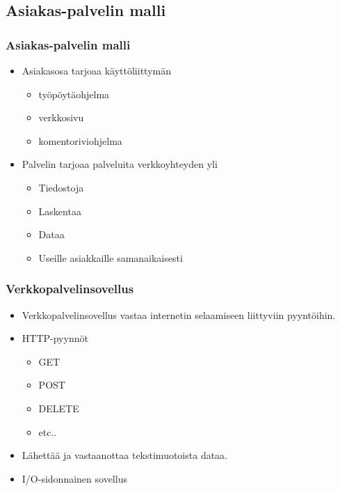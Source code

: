 \documentclass{beamer}
\begin{document}
\subsection{Asiakas-palvelin malli}
\begin{frame}
    \frametitle{Asiakas-palvelin malli}
    \begin{itemize}
        \item Asiakasosa tarjoaa käyttöliittymän
        \begin{itemize}
            \item työpöytäohjelma
            \item verkkosivu
            \item komentoriviohjelma
        \end{itemize}
        \item Palvelin tarjoaa palveluita verkkoyhteyden yli
            \begin{itemize}
                \item Tiedostoja
                \item Laskentaa
                \item Dataa
                \item Useille asiakkaille samanaikaisesti
            \end{itemize}
    \end{itemize}
\end{frame}
\begin{frame}
    \frametitle{Verkkopalvelinsovellus}
    \begin{itemize}
        \item Verkkopalvelinsovellus vastaa internetin selaamiseen liittyviin pyyntöihin.
        \item HTTP-pyynnöt
            \begin{itemize}
                \item GET
                \item POST
                \item DELETE
                \item etc..
            \end{itemize}
        \item Lähettää ja vastaanottaa tekstimuotoista dataa.
        \item I/O-sidonnainen sovellus
    \end{itemize}
\end{frame}
\end{document}
